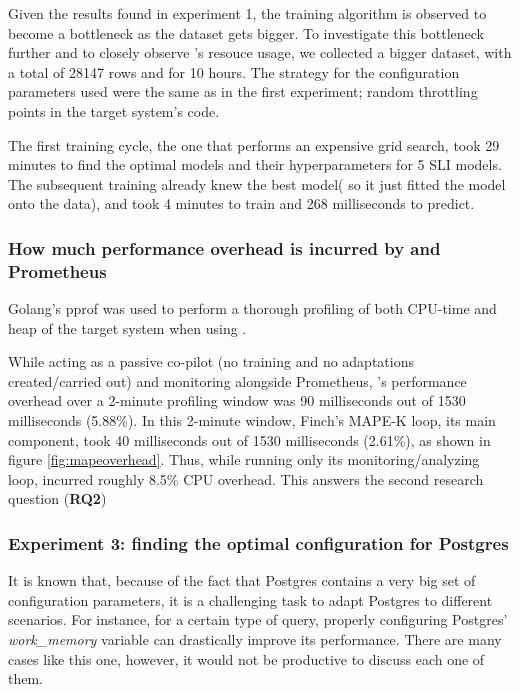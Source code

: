 Given the results found in experiment 1, the training algorithm is observed to become a bottleneck as the dataset gets bigger. To investigate this bottleneck further and to closely observe \projectname{}'s resouce usage, we collected a bigger dataset, with a total of 28147 rows and for 10 hours. The strategy for the configuration parameters used were the same as in the first experiment; random throttling points in the target system's code.

The first training cycle, the one that performs an expensive grid search, took 29 minutes to find the optimal models and their hyperparameters for 5 SLI models. The subsequent training already knew the best model( so it just fitted the model onto the data), and took 4 minutes to train and 268 milliseconds to predict.

\subsubsection{How much performance overhead is incurred by \projectname{} and Prometheus}

Golang's pprof was used to perform a thorough profiling of both CPU-time and heap of the target system when using \projectname{}.

While acting as a passive co-pilot (no training and no adaptations created/carried out) and monitoring alongside Prometheus, \projectname{}'s performance overhead over a 2-minute profiling window was 90 milliseconds out of 1530 milliseconds (5.88\%). In this 2-minute window, Finch's MAPE-K loop, its main component, took 40 milliseconds out of 1530 milliseconds (2.61\%), as shown in figure \ref{fig:mapeoverhead}. Thus, while running only its monitoring/analyzing loop, \projectname{} incurred roughly 8.5\% CPU overhead. This answers the second research question (\textbf{RQ2})


\subsubsection{Experiment 3: finding the optimal configuration for Postgres}

It is known that, because of the fact that Postgres contains a very big set of configuration parameters, it is a challenging task to adapt Postgres to different scenarios. For instance, for a certain type of query, properly configuring Postgres' \textit{work\_memory} variable can drastically improve its performance. There are many cases like this one, however, it would not be productive to discuss each one of them.

